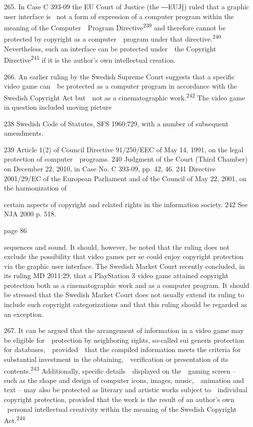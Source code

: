 \documentclass[
]{article}
\begin{document}
{265. }{In Case C 393-}{09 the EU Court of Justice (the ―EUJ‖) ruled
that a graphic user interface is }{~not a form of expression of a
computer program within the meaning of the }{Computer~~Program
Directive}\textsuperscript{{239 }}{and therefore cannot be protected by
copyright as a computer~~program under that
directive.}\textsuperscript{{240 }}{Nevertheless, such an interface can
be protected under~~the }{Copyright Directive}\textsuperscript{{241
}}{if it is the author's own intellectual creation}{.}

{266. }{An earlier ruling by the Swedish Supreme Court suggests that a
specific video game can~~be protected as a computer program in
accordance with the Swedish }{Copyright Act }{but~~not as a
cinematographic work.}\textsuperscript{{242 }}{The video game in
question included moving picture}

{238 }{Swedish }{Code of Statutes}{, SFS 1960:729, with a number of
subsequent amendments.}

{239 }{Article 1(2) of Council Directive 91/250/EEC of May 14, 1991, on
the legal protection of computer~~programs. }{240 }{Judgment of the
Court (Third Chamber) on December 22, 2010, in Case No. C 393-09, pp.
42, 46. }{241 }{Directive 2001/29/EC of the European Parliament and of
the Council of May 22, 2001, on the harmonization of}

{certain aspects of copyright and related rights in the information
society. }{242 }{See NJA 2000 p. 518.}

{page 86}

{sequences and sound. It should, however, be noted that the ruling does
not exclude the possibility that video games }{per se }{could enjoy
copyright protection via the graphic user interface. The Swedish Market
Court recently concluded, in its ruling MD 2011:29, that a PlayStation 3
video game attained copyright protection both as a }{cinematographic
work }{and as a }{computer program}{. It should be stressed that the
Swedish Market Court does not usually extend its ruling to include such
copyright categorizations and that this ruling should be regarded as an
exception.}

{267. }{It can be argued that the arrangement of information in a video
game may be eligible for~~protection by neighboring rights, so-called
}{sui generis }{protection for databases,~~provided~~that the compiled
information meets the criteria for substantial investment in the
obtaining,~~verification or presentation of its
contents.}\textsuperscript{{243 }}{Additionally, specific
details~~displayed on the~~gaming screen }{-- }{such as the shape and
design of computer icons, images, music,~~animation and text }{-- }{may
also be protected as literary and artistic works subject to~~individual
copyright protection, provided that }{the work is the result of an
author's own }{~personal intellectual creativity within the meaning of
the Swedish }{Copyright Act}{.}\textsuperscript{{244}}
\end{document}
